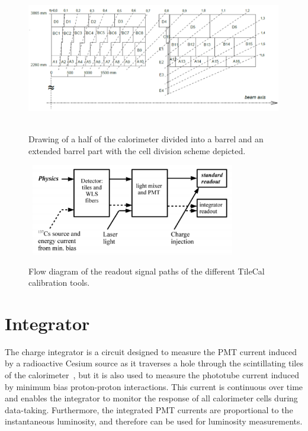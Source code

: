 \begin{figure}[!ht]
\begin{center}
\mbox{
  \includegraphics[width=0.995\textwidth]{Appendix_DetectorWork/Figures/ATLAS_Cells.eps}
}
\end{center}
\caption{Drawing of a half of the calorimeter divided into a barrel and an extended barrel part with the cell division scheme depicted.}
\label{fig:DetectorWork_ATLAS}
\end{figure}

\begin{figure}[!ht]
\begin{center}
\mbox{
  \includegraphics[width=0.795\textwidth]{Appendix_DetectorWork/Figures/ATLAS_3-in-1_Card.eps}
}
\end{center}
\caption{Flow diagram of the readout signal paths of the different TileCal calibration tools.}
\label{fig:DetectorWork_integrator}
\end{figure}



\section{Integrator}

The charge integrator is a circuit designed to measure the PMT current induced by a radioactive Cesium source as it traverses a hole through the scintillating tiles of the calorimeter~\cite{Starchenko:2002ju}, but it is also used to measure the phototube current induced by minimum bias proton-proton interactions.
This current is continuous over time and enables the integrator to monitor the response of all calorimeter cells during data-taking.
Furthermore, the integrated PMT currents are proportional to the instantaneous luminosity, and therefore can be used for luminosity measurements.

